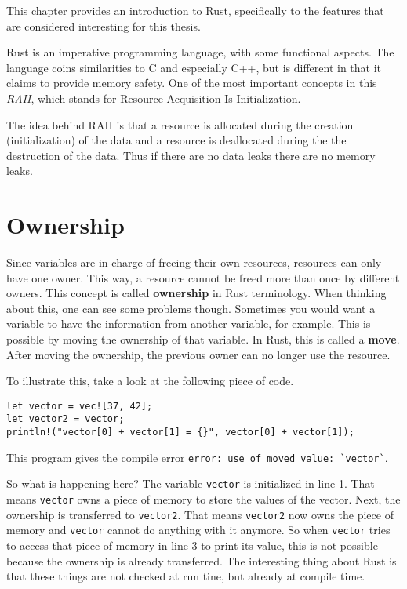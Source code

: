 This chapter provides an introduction to Rust, specifically to the features that are considered interesting for this thesis. 

Rust is an imperative programming language, with some functional aspects. The language coins similarities to C and especially C++, but is different in that it claims to provide memory safety. One of the most important concepts in this \emph{RAII}, which stands for Resource Acquisition Is Initialization. 

The idea behind RAII is that a resource is allocated during the creation (initialization) of the data and a resource is deallocated during the the destruction of the data. Thus if there are no data leaks there are no memory leaks.  

\section{Ownership} %
Since variables are in charge of freeing their own resources, resources can only have one owner. This way, a resource cannot be freed more than once by different owners. This concept is called \textbf{ownership} in Rust terminology. 
When thinking about this, one can see some problems though. Sometimes you would want a variable to have the information from another variable, for example. This is possible by moving the ownership of that variable. In Rust, this is called a \textbf{move}. After moving the ownership, the previous owner can no longer use the resource. 

To illustrate this, take a look at the following piece of code. 
\begin{verbatim}
let vector = vec![37, 42];
let vector2 = vector;
println!("vector[0] + vector[1] = {}", vector[0] + vector[1]);
\end{verbatim}
This program gives the compile error \verb|error: use of moved value: `vector`|. 

So what is happening here? The variable \verb|vector| is initialized in line 1. That means \verb|vector| owns a piece of memory to store the values of the vector. Next, the ownership is transferred to \verb|vector2|. That means \verb|vector2| now owns the piece of memory and \verb|vector| cannot do anything with it anymore. So when \verb|vector| tries to access that piece of memory in line 3 to print its value, this is not possible because the ownership is already transferred. The interesting thing about Rust is that these things are not checked at run tine, but already at compile time.

